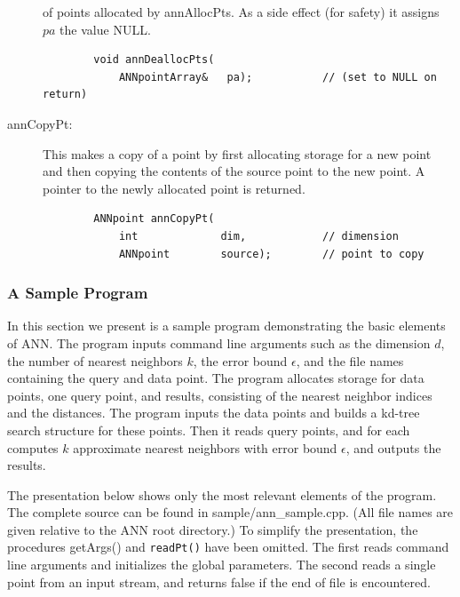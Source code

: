 \documentclass[11pt]{article}		%
\newcommand{\ANN}[0]{\textsf{ANN}}
\begin{document}
\begin{description}
	of points allocated by \textsf{annAllocPts}.  As a side effect
	(for safety) it assigns $pa$ the value \textsf{NULL}.
	{\small \begin{verbatim}
	    void annDeallocPts(
	        ANNpointArray&   pa);           // (set to NULL on return)
	\end{verbatim} }
\item[annCopyPt:] This makes a copy of a point by first allocating
	storage for a new point and then copying the contents of the source
	point to the new point.  A pointer to the newly allocated point is
	returned.
	{\small \begin{verbatim}
	    ANNpoint annCopyPt(
	        int             dim,            // dimension
	        ANNpoint        source);        // point to copy
	\end{verbatim} }
\end{description}

\subsubsection{A Sample Program} \label{annsample.sec}

In this section we present is a sample program demonstrating the basic
elements of {\ANN}.  The program inputs command line arguments such as
the dimension $d$, the number of nearest neighbors $k$, the error bound
$\epsilon$, and the file names containing the query and data point.  The
program allocates storage for data points, one query point, and results,
consisting of the nearest neighbor indices and the distances.  The
program inputs the data points and builds a kd-tree search structure for
these points.  Then it reads query points, and for each computes $k$
approximate nearest neighbors with error bound $\epsilon$, and outputs
the results.

The presentation below shows only the most relevant elements of the
program.  The complete source can be found in
\textsf{sample/ann\_sample.cpp}. (All file names are given relative to
the {\ANN} root directory.) To simplify the presentation, the procedures
\textsf{getArgs()} and {\tt readPt()} have been omitted.  The first
reads command line arguments and initializes the global parameters.  The
second reads a single point from an input stream, and returns false if
the end of file is encountered.
\end{document}
